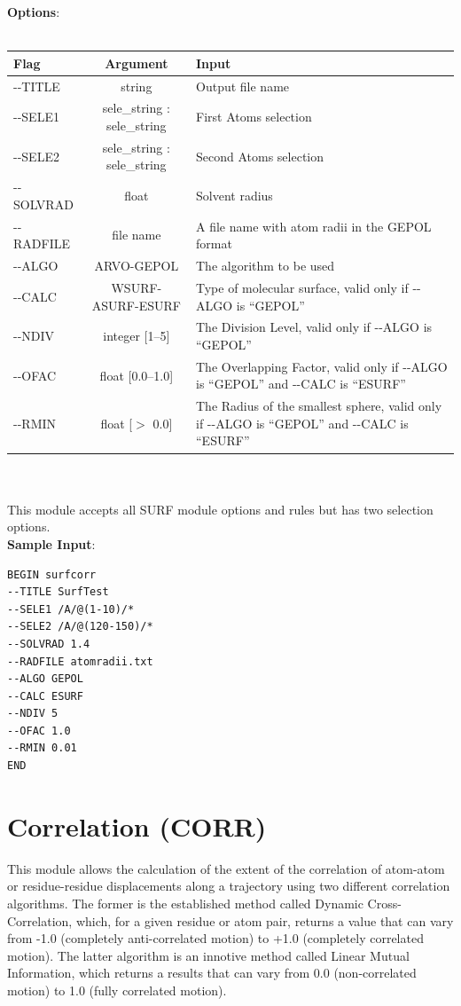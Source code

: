 \documentclass[11pt,twoside,onecolumn,a4paper,openright,notitlepage]{book}[2001/04/21]
\begin{document}
\textbf{\large Options}:\\\\
\begin{tabular}{l|c|p{7.0cm}}
Flag & Argument & Input \\
\hline
-{}-TITLE         & string                        & Output file name\\
-{}-SELE1         & sele\_string : sele\_string   & First Atoms selection\\
-{}-SELE2         & sele\_string : sele\_string   & Second Atoms selection\\
-{}-SOLVRAD       & float                         & Solvent radius\\
-{}-RADFILE       & file name                     & A file name with atom radii in the GEPOL format\\
-{}-ALGO          & ARVO-GEPOL                    & The algorithm to be used\\
-{}-CALC          & WSURF-ASURF-ESURF             & Type of molecular surface, valid only if -{}-ALGO is ``GEPOL''\\
-{}-NDIV          & integer [1--5]                & The Division Level, valid only if -{}-ALGO is ``GEPOL''\\
-{}-OFAC          & float [0.0--1.0]              & The Overlapping Factor, valid only if -{}-ALGO is ``GEPOL'' and -{}-CALC is ``ESURF''\\
-{}-RMIN          & float [$>$ 0.0]                 & The Radius of the smallest sphere, valid only if -{}-ALGO is ``GEPOL'' and -{}-CALC is ``ESURF''\\
\end{tabular}\\\\

This module accepts all SURF module options and rules but has two selection options.\\

\textbf{\large Sample Input}:
\begin{verbatim}
BEGIN surfcorr
--TITLE SurfTest
--SELE1 /A/@(1-10)/*
--SELE2 /A/@(120-150)/*
--SOLVRAD 1.4
--RADFILE atomradii.txt
--ALGO GEPOL
--CALC ESURF
--NDIV 5
--OFAC 1.0
--RMIN 0.01
END
\end{verbatim}

\clearpage

\section{Correlation (CORR)}
This module allows the calculation of the extent of the correlation of atom-atom or residue-residue displacements along a trajectory using two different correlation algorithms. The former is the established method called Dynamic Cross-Correlation\cite{mccammon1988dynamics}, which, for a given residue or atom pair, returns a value that can vary from -1.0 (completely anti-correlated motion) to +1.0 (completely correlated motion). The latter algorithm is an innotive method called Linear Mutual Information\cite{kraskov2004estimating, lange2006generalized}, which returns a results that can vary from 0.0 (non-correlated motion) to 1.0 (fully correlated motion).
\end{document}
